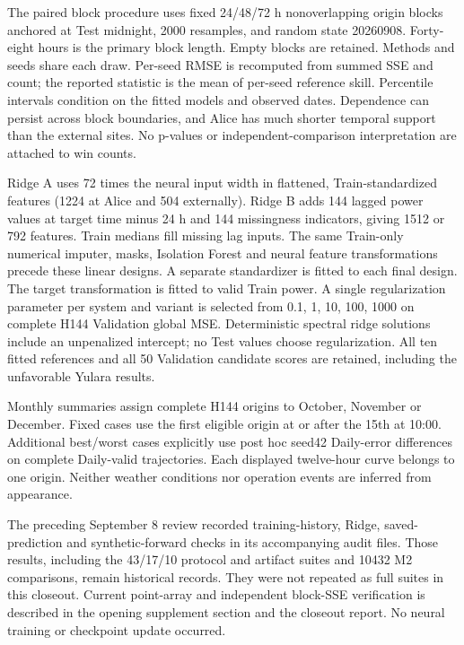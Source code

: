 The paired block procedure uses fixed 24/48/72 h nonoverlapping origin blocks anchored at Test midnight, 2000 resamples, and random state 20260908. Forty-eight hours is the primary block length. Empty blocks are retained. Methods and seeds share each draw. Per-seed RMSE is recomputed from summed SSE and count; the reported statistic is the mean of per-seed reference skill. Percentile intervals condition on the fitted models and observed dates. Dependence can persist across block boundaries, and Alice has much shorter temporal support than the external sites. No p-values or independent-comparison interpretation are attached to win counts.

Ridge A uses 72 times the neural input width in flattened, Train-standardized features (1224 at Alice and 504 externally). Ridge B adds 144 lagged power values at target time minus 24 h and 144 missingness indicators, giving 1512 or 792 features. Train medians fill missing lag inputs. The same Train-only numerical imputer, masks, Isolation Forest and neural feature transformations precede these linear designs. A separate standardizer is fitted to each final design. The target transformation is fitted to valid Train power. A single regularization parameter per system and variant is selected from 0.1, 1, 10, 100, 1000 on complete H144 Validation global MSE. Deterministic spectral ridge solutions include an unpenalized intercept; no Test values choose regularization. All ten fitted references and all 50 Validation candidate scores are retained, including the unfavorable Yulara results.

Monthly summaries assign complete H144 origins to October, November or December. Fixed cases use the first eligible origin at or after the 15th at 10:00. Additional best/worst cases explicitly use post hoc seed42 Daily-error differences on complete Daily-valid trajectories. Each displayed twelve-hour curve belongs to one origin. Neither weather conditions nor operation events are inferred from appearance.

The preceding September 8 review recorded training-history, Ridge, saved-prediction and synthetic-forward checks in its accompanying audit files. Those results, including the 43/17/10 protocol and artifact suites and 10432 M2 comparisons, remain historical records. They were not repeated as full suites in this closeout. Current point-array and independent block-SSE verification is described in the opening supplement section and the closeout report. No neural training or checkpoint update occurred.
